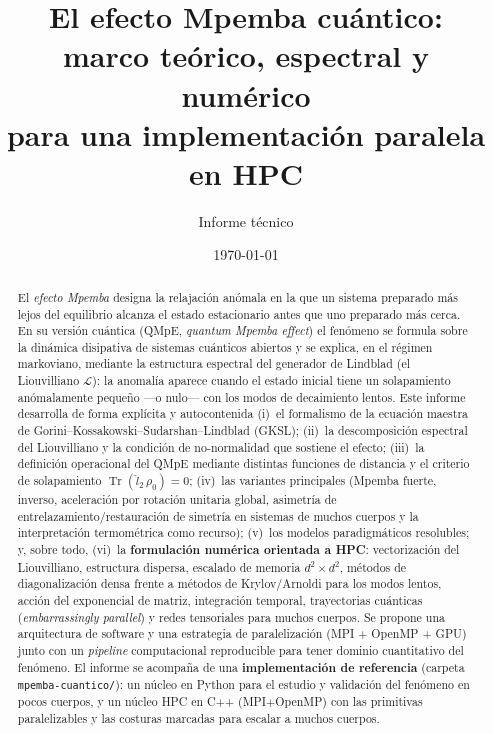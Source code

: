 \documentclass[11pt,a4paper]{article}
\title{\textbf{El efecto Mpemba cuántico:\\ marco teórico, espectral y numérico\\ para una implementación paralela en HPC}}
\author{Informe técnico}
\date{\today}
\theoremstyle{definition}
\theoremstyle{plain}
\newcommand{\Lop}{\mathcal{L}}
\renewcommand{\Tr}{\operatorname{Tr}}
\begin{document}
\maketitle

\begin{abstract}
\noindent
El \emph{efecto Mpemba} designa la relajación anómala en la que un sistema preparado más lejos del equilibrio
alcanza el estado estacionario antes que uno preparado más cerca. En su versión cuántica (QMpE, \emph{quantum
Mpemba effect}) el fenómeno se formula sobre la dinámica disipativa de sistemas cuánticos abiertos y se
explica, en el régimen markoviano, mediante la estructura espectral del generador de Lindblad (el
Liouvilliano $\Lop$): la anomalía aparece cuando el estado inicial tiene un solapamiento anómalamente
pequeño —o nulo— con los modos de decaimiento lentos. Este informe desarrolla de forma explícita y
autocontenida (i)~el formalismo de la ecuación maestra de Gorini--Kossakowski--Sudarshan--Lindblad (GKSL);
(ii)~la descomposición espectral del Liouvilliano y la condición de no-normalidad que sostiene el efecto;
(iii)~la definición operacional del QMpE mediante distintas funciones de distancia y el criterio de
solapamiento $\Tr(\hat l_2\,\rho_0)=0$; (iv)~las variantes principales (Mpemba fuerte, inverso, aceleración
por rotación unitaria global, asimetría de entrelazamiento/restauración de simetría en sistemas de muchos
cuerpos y la interpretación termométrica como recurso); (v)~los modelos paradigmáticos resolubles; y,
sobre todo, (vi)~la \textbf{formulación numérica orientada a HPC}: vectorización del Liouvilliano,
estructura dispersa, escalado de memoria $d^2\times d^2$, métodos de diagonalización densa frente a métodos
de Krylov/Arnoldi para los modos lentos, acción del exponencial de matriz, integración temporal,
trayectorias cuánticas (\emph{embarrassingly parallel}) y redes tensoriales para muchos cuerpos. Se propone
una arquitectura de software y una estrategia de paralelización (MPI + OpenMP + GPU) junto con un
\emph{pipeline} computacional reproducible para tener dominio cuantitativo del fenómeno. El informe se
acompaña de una \textbf{implementación de referencia} (carpeta \texttt{mpemba-cuantico/}): un núcleo
en Python para el estudio y validación del fenómeno en pocos cuerpos, y un núcleo HPC en C++ (MPI${+}$OpenMP)
con las primitivas paralelizables y las costuras marcadas para escalar a muchos cuerpos.
\end{abstract}

\tableofcontents
\bigskip
\end{document}
